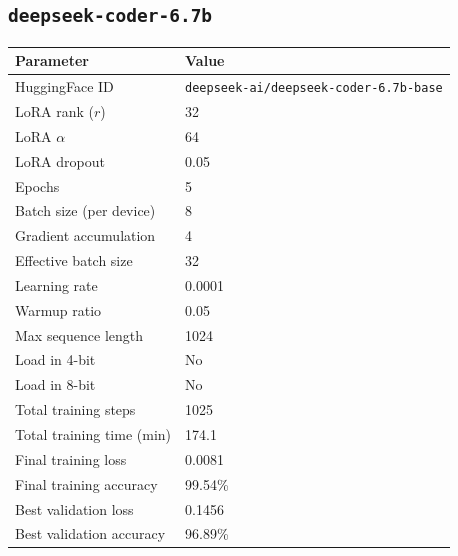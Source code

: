 \documentclass[11pt,a4paper]{article}
\begin{document}
\subsection{\texttt{deepseek-coder-6.7b}}

\begin{table}[H]
  \centering
  \begin{tabular}{ll}
    \toprule
    \textbf{Parameter}        & \textbf{Value}                                \\
    \midrule
    HuggingFace ID            & \texttt{deepseek-ai/deepseek-coder-6.7b-base} \\
    LoRA rank ($r$)           & 32                                            \\
    LoRA $\alpha$             & 64                                            \\
    LoRA dropout              & 0.05                                          \\
    Epochs                    & 5                                             \\
    Batch size (per device)   & 8                                             \\
    Gradient accumulation     & 4                                             \\
    Effective batch size      & 32                                            \\
    Learning rate             & 0.0001                                        \\
    Warmup ratio              & 0.05                                          \\
    Max sequence length       & 1024                                          \\
    Load in 4-bit             & No                                            \\
    Load in 8-bit             & No                                            \\
    Total training steps      & 1025                                          \\
    Total training time (min) & 174.1                                         \\
    Final training loss       & 0.0081                                        \\
    Final training accuracy   & 99.54\%                                       \\
    Best validation loss      & 0.1456                                        \\
    Best validation accuracy  & 96.89\%                                       \\
    \bottomrule
  \end{tabular}
\end{table}
\end{document}

